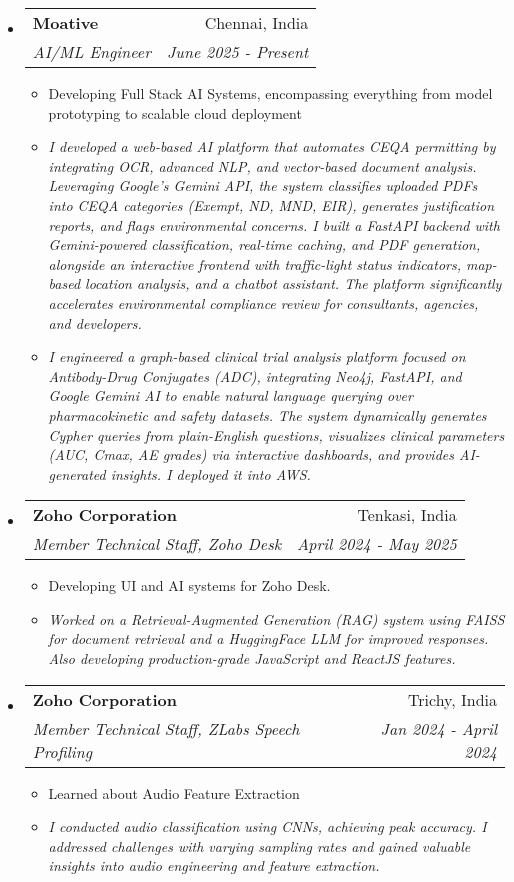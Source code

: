 \documentclass[letterpaper,11pt]{article}
\makeatletter
\newcommand{\resitem}[1]{\item #1 \vspace{-2pt}}
\newcommand{\resheading}[1]{\textbf{\sffamily{\mbox{~}{\large #1} \vphantom{p\^{E}}}}}
\newcommand{\ressubheading}[4]{
\begin{tabular*}{6.5in}{l@{\extracolsep{\fill}}r}
    \textbf{#1} & #2 \\
    \textit{#3} & \textit{#4} \\
\end{tabular*}\vspace{-4pt}} %
\makeatother
\begin{document}
\resheading{Work Experience}
\begin{itemize}
\item[]
    \ressubheading{Moative}{Chennai, India}{AI/ML Engineer}{June 2025 - Present}
    \begin{itemize}
        \resitem{Developing Full Stack AI Systems, encompassing everything from model prototyping to scalable cloud deployment}
	\resitem{\textit{I developed a web-based AI platform that automates CEQA permitting by integrating OCR, advanced NLP, and vector-based document analysis. Leveraging Google's Gemini API, the system classifies uploaded PDFs into CEQA categories (Exempt, ND, MND, EIR), generates justification reports, and flags environmental concerns. I built a FastAPI backend with Gemini-powered classification, real-time caching, and PDF generation, alongside an interactive frontend with traffic-light status indicators, map-based location analysis, and a chatbot assistant. The platform significantly accelerates environmental compliance review for consultants, agencies, and developers.}}
	\resitem{\textit{I engineered a graph-based clinical trial analysis platform focused on Antibody-Drug Conjugates (ADC), integrating Neo4j, FastAPI, and Google Gemini AI to enable natural language querying over pharmacokinetic and safety datasets. The system dynamically generates Cypher queries from plain-English questions, visualizes clinical parameters (AUC, Cmax, AE grades) via interactive dashboards, and provides AI-generated insights. I deployed it into AWS.}}
    \end{itemize}
\item[]
    \ressubheading{Zoho Corporation}{Tenkasi, India}{Member Technical Staff, Zoho Desk}{April 2024 - May 2025}
    \begin{itemize}
        \resitem{Developing UI and AI systems for Zoho Desk.}
        \resitem{\textit{Worked on a Retrieval-Augmented Generation (RAG) system using FAISS for document retrieval and a HuggingFace LLM for improved responses. Also developing production-grade JavaScript and ReactJS features.}}
    \end{itemize}
\item[]
	\ressubheading{Zoho Corporation}{Trichy, India}{Member Technical Staff, ZLabs Speech Profiling}{Jan 2024 - April 2024}
	\begin{itemize}
		\resitem{Learned about Audio Feature Extraction}
		\resitem{\textit{I conducted audio classification using CNNs, achieving peak accuracy. I addressed challenges with varying sampling rates and gained valuable insights into audio engineering and feature extraction.}}
	\end{itemize}
	

\end{itemize}
\end{document}
